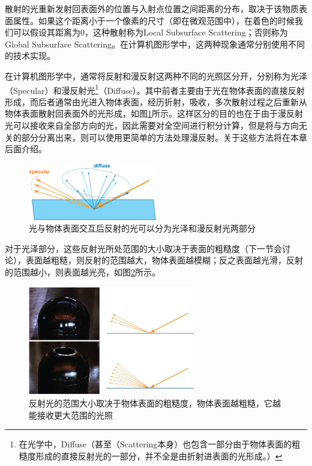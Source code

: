 散射的光重新发射回表面外的位置与入射点位置之间距离的分布，取决于该物质表面属性。如果这个距离小于一个像素的尺寸（即在微观范围中），在着色的时候我们可以假设其距离为$0$，这种散射称为Local Subsurface Scattering；否则称为Global Subsurface Scattering。在计算机图形学中，这两种现象通常分别使用不同的技术实现。

在计算机图形学中，通常将反射和漫反射这两种不同的光照区分开，分别称为光泽（Specular）和漫反射光\footnote{在光学中，Diffuse（甚至（Scattering本身）也包含一部分由于物体表面的粗糙度形成的直接反射光的一部分，并不全是由折射进表面的光形成。）}（Diffuse）。其中前者主要由于光在物体表面的直接反射形成，而后者通常由光进入物体表面，经历折射，吸收，多次散射过程之后重新从物体表面散射回表面外的光形成，如图\ref{f:intro-specular-and-diffuse}所示。这样区分的目的也在于由于漫反射光可以接收来自全部方向的光，因此需要对全空间进行积分计算，但是将与方向无关的部分分离出来，则可以使用更简单的方法处理漫反射。关于这些方法将在本章后面介绍。

\begin{figure}
\sidecaption
	\includegraphics[width=0.5\textwidth]{figures/intro/ray-optics-6}
	\caption{光与物体表面交互后反射的光可以分为光泽和漫反射光两部分}
	\label{f:intro-specular-and-diffuse}
\end{figure}

对于光泽部分，这些反射光所处范围的大小取决于表面的粗糙度（下一节会讨论），表面越粗糙，则反射的范围越大，物体表面越模糊；反之表面越光滑，反射的范围越小，则表面越光亮，如图\ref{f:intro-roughness}所示。

\begin{figure}
\sidecaption
	\includegraphics[width=0.65\textwidth]{figures/intro/ray-optics-2}
	\caption{反射光的范围大小取决于物体表面的粗糙度，物体表面越粗糙，它越能接收更大范围的光照}
	\label{f:intro-roughness}
\end{figure}




